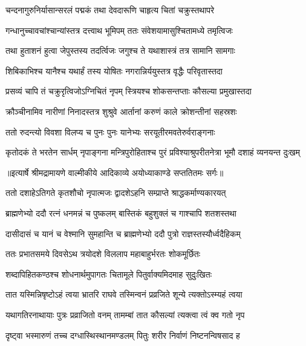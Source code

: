 \twolineshloka
{चन्दनागुरुनिर्यासान्सरलं पद्मकं तथा}
{देवदारूणि चाहृत्य चितां चक्रुस्तथापरे} %

\twolineshloka
{गन्धानुच्चावचांश्चान्यांस्तत्र दत्त्वाथ भूमिपम्}
{ततः संवेशयामासुश्चितामध्ये तमृत्विजः} %

\twolineshloka
{तथा हुताशनं हुत्वा जेपुस्तस्य तदर्त्विजः}
{जगुश्च ते यथाशास्त्रं तत्र सामानि सामगाः} %

\twolineshloka
{शिबिकाभिश्च यानैश्च यथार्हं तस्य योषितः}
{नगरान्निर्ययुस्तत्र वृद्धैः परिवृतास्तदा} %

\twolineshloka
{प्रसव्यं चापि तं चक्रुरृत्विजोऽग्निचितं नृपम्}
{स्त्रियश्च शोकसन्तप्ताः कौसल्या प्रमुखास्तदा} %

\twolineshloka
{क्रौञ्चीनामिव नारीणां निनादस्तत्र शुश्रुवे}
{आर्तानां करुणं काले क्रोशन्तीनां सहस्रशः} %

\twolineshloka
{ततो रुदन्त्यो विवशा विलप्य च पुनः पुनः}
{यानेभ्यः सरयूतीरमवतेरुर्वराङ्गनाः} %

\fourlineindentedshloka
{कृतोदकं ते भरतेन सार्धम्}
{नृपाङ्गना मन्त्रिपुरोहिताश्च}
{पुरं प्रविश्याश्रुपरीतनेत्रा}
{भूमौ दशाहं व्यनयन्त दुःखम्} %


{॥इत्यार्षे श्रीमद्रामायणे वाल्मीकीये आदिकाव्ये अयोध्याकाण्डे सप्ततितमः सर्गः॥}


\twolineshloka
{ततो दशाहेऽतिगते कृतशौचो नृपात्मजः}
{द्वादशेऽहनि सम्प्राप्ते श्राद्धकर्माण्यकारयत्} %

\twolineshloka
{ब्राह्मणेभ्यो ददौ रत्नं धनमन्नं च पुष्कलम्}
{बास्तिकं बहुशुक्लं च गाश्चापि शतशस्तथा} %

\twolineshloka
{दासीदासं च यानं च वेश्मानि सुमहान्ति च}
{ब्राह्मणेभ्यो ददौ पुत्रो राज्ञस्तस्यौर्ध्वदैहिकम्} %

\twolineshloka
{ततः प्रभातसमये दिवसेऽथ त्रयोदशे}
{विललाप महाबाहुर्भरतः शोकमूर्छितः} %

\twolineshloka
{शब्दापिहितकण्ठश्च शोधनार्थमुपागतः}
{चितामूले पितुर्वाक्यमिदमाह सुदुःखितः} %

\twolineshloka
{तात यस्मिन्निषृष्टोऽहं त्वया भ्रातरि राघवे}
{तस्मिन्वनं प्रव्रजिते शून्ये त्यक्तोऽस्म्यहं त्वया} %

\twolineshloka
{यथागतिरनाथायाः पुत्रः प्रव्राजितो वनम्}
{तामम्बां तात कौसल्यां त्यक्त्वा त्वं क्व गतो नृप} %

\twolineshloka
{दृष्ट्वा भस्मारुणं तच्च दग्धास्थिस्थानमण्डलम्}
{पितुः शरीर निर्वाणं निष्टनन्विषसाद ह} %


